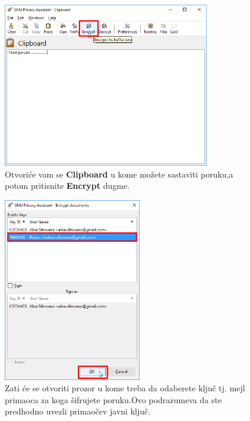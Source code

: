 \documentclass[a4paper,11pt]{article}
\begin{document}
\begin{figure}[!h]
	\begin{center}
		\includegraphics[width=9cm]{wlm_GPA_clipboard2.png}
		\caption{Otvori\'{c}e vam se \textbf{Clipboard} u kome mo\v{z}ete sastaviti poruku,\newline a potom pritisnite \textbf{Encrypt} dugme.}
		\label{gpa_WLM2}
	\end{center}
\end{figure}
\bigskip
\bigskip
\newpage
\begin{figure}[!h]
	\begin{center}
		\includegraphics[width=6cm]{wlm_GPA_clipboard_encrypt.png}
		\caption{Zati \'{c}e se otvoriti prozor u kome treba da odaberete klju\v{c} tj. mejl primaoca za koga \v{s}ifrujete poruku.\newline Ovo podrazumeva da ste  predhodno uvezli primao\v{c}ev javni klju\v{c}.}
		\label{gpa_WLM3}
	\end{center}
\end{figure}
\end{document}
